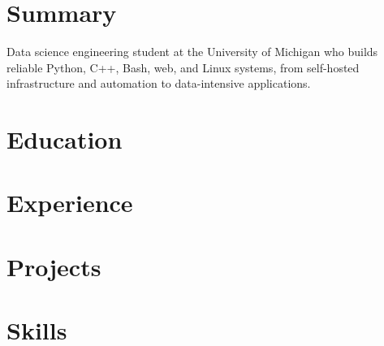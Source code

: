 \documentclass[compact]{resume}
\begin{document}
\section{Summary}
Data science engineering student at the University of Michigan who builds reliable Python, C++, Bash, web, and Linux systems, from self-hosted infrastructure and automation to data-intensive applications.

\section{Education}


\section{Experience}




\section{Projects}









\section{Skills}

\end{document}
